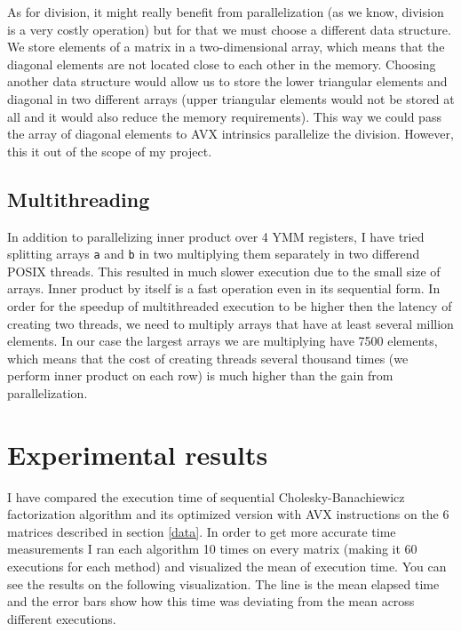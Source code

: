 \documentclass[sigplan]{acmart}
\begin{document}
As for division, it might really benefit from parallelization (as we know, division is a very costly operation) but for that we must choose a different data structure. We store elements of a matrix in a two-dimensional array, which means that the diagonal elements are not located close to each other in the memory. Choosing another data structure would allow us to store the lower triangular elements and diagonal in two different arrays (upper triangular elements would not be stored at all and it would also reduce the memory requirements). This way we could pass the array of diagonal elements to AVX intrinsics parallelize the division. However, this it out of the scope of my project.

\subsection{Multithreading}

In addition to parallelizing inner product over 4 YMM registers, I have tried splitting arrays \texttt{a} and \texttt{b} in two multiplying them separately in two differend POSIX threads. This resulted in much slower execution due to the small size of arrays. Inner product by itself is a fast operation even in its sequential form. In order for the speedup of multithreaded execution to be higher then the latency of creating two threads, we need to multiply arrays that have at least several million elements. In our case the largest arrays we are multiplying have 7500 elements, which means that the cost of creating threads several thousand times (we perform inner product on each row) is much higher than the gain from parallelization.

\section{Experimental results}
\label{exp-res}

I have compared the execution time of sequential Cholesky-Banachiewicz factorization algorithm and its optimized version with AVX instructions on the 6 matrices described in section \ref{data}. In order to get more accurate time measurements I ran each algorithm 10 times on every matrix (making it 60 executions for each method) and visualized the mean of execution time. You can see the results on the following visualization. The line is the mean elapsed time and the error bars show how this time was deviating from the mean across different executions.
\end{document}
